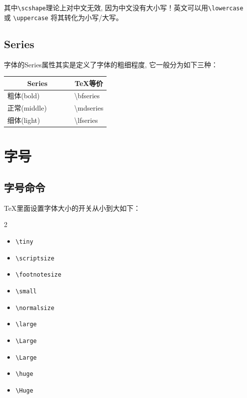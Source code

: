 其中\verb|\scshape|理论上对中文无效, 因为中文没有大小写！英文可以用\verb|\lowercase| 或 \verb|\uppercase| 将其转化为小写/大写。

\subsection{Series}

字体的Series属性其实是定义了字体的粗细程度, 它一般分为如下三种：

\begin{table}[h]
    \centering
    \begin{tabular}{@{}ll@{}}
    \toprule
    \multicolumn{1}{c}{\textbf{Series}} & \multicolumn{1}{c}{\textbf{TeX等价}} \\ \midrule
    粗体(bold)                        & \textbackslash{}bfseries          \\
    正常(middle)~~~~~~                  & \textbackslash{}mdseries          \\
    细体(light)         & \textbackslash{}lfseries          \\ \bottomrule
    \end{tabular}
\end{table}

\section{字号}

\subsection{字号命令}

TeX里面设置字体大小的开关从小到大如下：

\begin{multicols}{2}
    \begin{itemize}
      \item \verb|\tiny|
      \item \verb|\scriptsize|
      \item \verb|\footnotesize|
      \item \verb|\small|
      \item \verb|\normalsize|
      \item \verb|\large|
      \item \verb|\Large|
      \item \verb|\Large|
      \item \verb|\huge|
      \item \verb|\Huge|
    \end{itemize}
\end{multicols}

